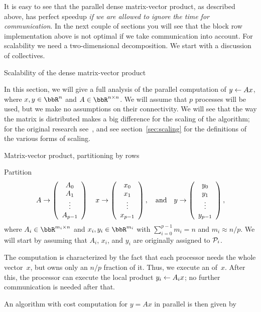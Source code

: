 It is easy to see that the parallel dense matrix-vector product, as
described above, has perfect speedup \emph{if we are allowed to ignore
the time for communication}. In the next couple of sections you will
see that the block row implementation above is not optimal if we take
communication into account. For scalability we need a two-dimensional
decomposition. We start with a discussion of collectives.

 {Scalability of the dense matrix-vector product}
\label{sec:densescaling}



In this section, we will give a full analysis of the parallel
computation of $ y \leftarrow A x $,
where $ x, y \in \Rn $ and $ A \in \Rnxn $.
We will assume that $ p $ processes will be used, but we make no
assumptions on their connectivity. We will see that the way the matrix
is distributed makes a big difference for the scaling of the
algorithm; for the original research
see~\cite{HeWo:94,Schreiber:scalability92,Stewart90}, and see
section~\ref{sec:scaling} for the definitions of the various forms of
scaling.

 {Matrix-vector product, partitioning by rows}
\label{sec:mvp-by-rows}

Partition
\[
A \rightarrow \left( \begin{array}{c} A_0 \\ A_1 \\ \vdots \\ A_{p-1} \end{array} \right) 
\quad
x \rightarrow \left( \begin{array}{c} x_0 \\ x_1 \\ \vdots \\ x_{p-1} \end{array} \right) ,
\quad
\mbox{and}
\quad
y \rightarrow \left( \begin{array}{c} y_0 \\ y_1 \\ \vdots \\ y_{p-1} \end{array} \right) ,
\]
where $ A_i \in \bbR^{m_i \times n} $ and $ x_i, y_i \in \bbR^{m_i} $ with
$ \sum_{i=0}^{p-1} m_i = n $ and $ m_i \approx n / p $.
We will start by assuming
that $ A_i $, $ x_i $, and $ y_i $ are originally assigned to $ {\cal P}_i $.

The computation is characterized by the fact that each processor needs
the whole vector~$x$, but owns only an $n/p$ fraction of it. Thus, we
execute an  of~$x$. After this, the processor can
execute the local product $y_i\leftarrow A_ix$; no further communication
is needed after that.

An algorithm with cost computation
for $ y = A x $ in parallel is then given by

